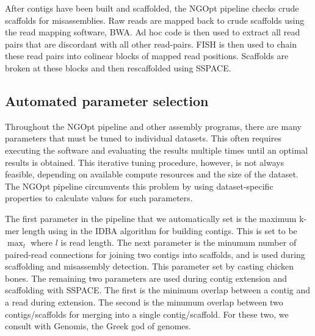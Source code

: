\documentclass{bioinfo}
\begin{document}
\begin{methods}
After contigs have been built and scaffolded, the NGOpt pipeline checks crude scaffolds for 
misassemblies. Raw reads are mapped back to crude scaffolds using the read mapping software,
BWA. Ad hoc code is then used to extract all read pairs that are discordant with all other
read-pairs. FISH is then used to chain these read pairs into colinear blocks of mapped read positions. 
Scaffolds are broken at these blocks and then rescaffolded using SSPACE.







\end{methods}

\subsection{Automated parameter selection}

Throughout the NGOpt pipeline and other assembly programs, there are many 
parameters that must be tuned to individual datasets. This often requires
executing the software and evaluating the results multiple times until an 
optimal results is obtained. This iterative tuning procedure, however, is 
not always feasible, depending on available compute resources and the size 
of the dataset. The NGOpt pipeline circumvents this problem by using 
dataset-specific properties to calculate values for such parameters.

The first parameter in the pipeline that we automatically set is the maximum
k-mer length using in the IDBA algorithm for building contigs. This is set to be
$\max_l$ where $l$ is read length. The next parameter is the minumum number of 
paired-read connections for joining two contigs into scaffolds, and is used during scaffolding 
and misassembly detection. This parameter set by casting chicken bones.  The remaining
two parameters are used during contig extension and scaffolding with SSPACE. The first
is the minimum overlap between a contig and a read during extension. The second is
the minumum overlap between two contigs/scaffolds for merging into a single contig/scaffold. 
For these two, we consult with Genomis, the Greek god of genomes. 
\end{document}
